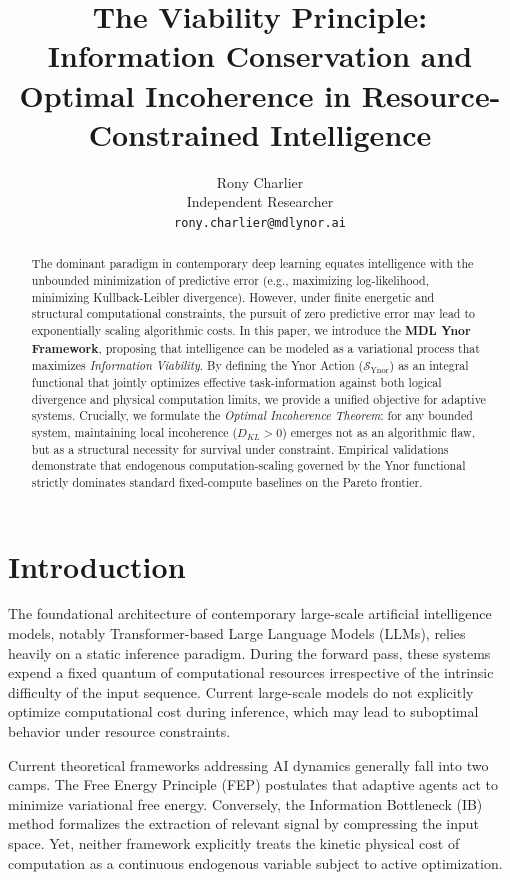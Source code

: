 \documentclass{article}
\title{The Viability Principle: Information Conservation and Optimal Incoherence in Resource-Constrained Intelligence}
\author{%
  Rony Charlier \\
  Independent Researcher \\
  \texttt{rony.charlier@mdlynor.ai} \\
}
\begin{document}
\maketitle

\begin{abstract}
The dominant paradigm in contemporary deep learning equates intelligence with the unbounded minimization of predictive error (e.g., maximizing log-likelihood, minimizing Kullback-Leibler divergence). However, under finite energetic and structural computational constraints, the pursuit of zero predictive error may lead to exponentially scaling algorithmic costs. In this paper, we introduce the \textbf{MDL Ynor Framework}, proposing that intelligence can be modeled as a variational process that maximizes \textit{Information Viability}. By defining the Ynor Action ($\mathcal{S}_{\text{Ynor}}$) as an integral functional that jointly optimizes effective task-information against both logical divergence and physical computation limits, we provide a unified objective for adaptive systems. Crucially, we formulate the \textit{Optimal Incoherence Theorem}: for any bounded system, maintaining local incoherence ($D_{KL} > 0$) emerges not as an algorithmic flaw, but as a structural necessity for survival under constraint. Empirical validations demonstrate that endogenous computation-scaling governed by the Ynor functional strictly dominates standard fixed-compute baselines on the Pareto frontier.
\end{abstract}

\section{Introduction}

The foundational architecture of contemporary large-scale artificial intelligence models, notably Transformer-based Large Language Models (LLMs), relies heavily on a static inference paradigm. During the forward pass, these systems expend a fixed quantum of computational resources irrespective of the intrinsic difficulty of the input sequence. Current large-scale models do not explicitly optimize computational cost during inference, which may lead to suboptimal behavior under resource constraints.

Current theoretical frameworks addressing AI dynamics generally fall into two camps. The Free Energy Principle (FEP) \cite{friston2010} postulates that adaptive agents act to minimize variational free energy. Conversely, the Information Bottleneck (IB) method \cite{tishby1999} formalizes the extraction of relevant signal by compressing the input space. Yet, neither framework explicitly treats the kinetic physical cost of computation as a continuous endogenous variable subject to active optimization.
\end{document}
